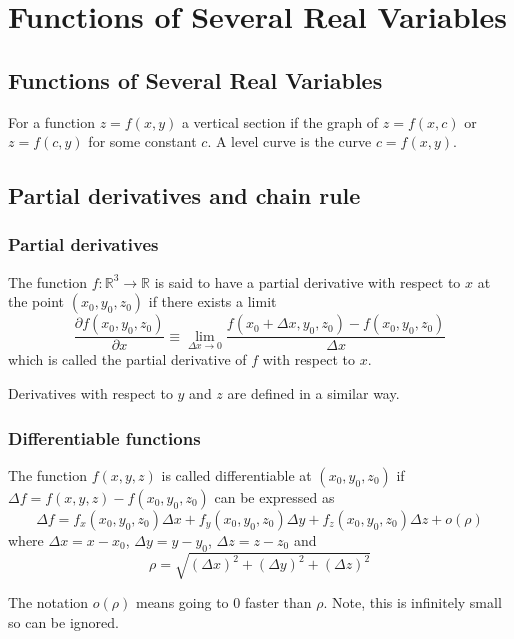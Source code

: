 \documentclass[12pt]{article}
\begin{document}

\tableofcontents
\pagebreak



\section{Functions of Several Real Variables}
	\subsection{Functions of Several Real Variables}
		\begin{defn} 
			For a function $z = f(x,y)$ a vertical section if the graph of $z = f(x,c)$ or $z = f(c,y)$ 
			for some constant $c$. A level curve is the curve $c = f(x,y)$.
		\end{defn}

	\subsection{Partial derivatives and chain rule}

		\subsubsection{Partial derivatives}
		\begin{defn}
			The function $f: \mathbb{R}^3 \to \mathbb{R}$ is said to have a partial derivative with respect to $x$
			at the point $(x_0, y_0, z_0)$ if there exists a limit
				\[
					\frac{\partial f (x_0, y_0, z_0)}{\partial x} \equiv \lim_{\Delta x \to 0} 
					\frac{f(x_0 + \Delta x, y_0, z_0) - f(x_0, y_0, z_0)}{\Delta x}
				\]
			which is called the partial derivative of $f$ with respect to $x$.
		\end{defn}
		
		Derivatives with respect to $y$ and $z$ are defined in a similar way.

		\subsubsection{Differentiable functions}
		\begin{defn}
			The function $f(x,y,z)$ is called differentiable at $(x_0, y_0, z_0)$ if 
			$\Delta f = f(x,y,z) - f(x_0, y_0, z_0)$ can be expressed as
			\[
				\Delta f = f_x(x_0, y_0, z_0) \Delta x + f_y(x_0, y_0, z_0) \Delta y + f_z(x_0, y_0, z_0) \Delta z + o(\rho)
			\]
			where $\Delta x = x - x_0$, $\Delta y = y - y_0$, $\Delta z = z - z_0$ and 
			\[
				\rho = \sqrt{ (\Delta x)^2 + (\Delta y)^2 + (\Delta z)^2 }
			\]
		\end{defn}
		The notation $o(\rho)$ means going to $0$ faster than $\rho$. Note, this is infinitely small so can be ignored.
		
\end{document}
